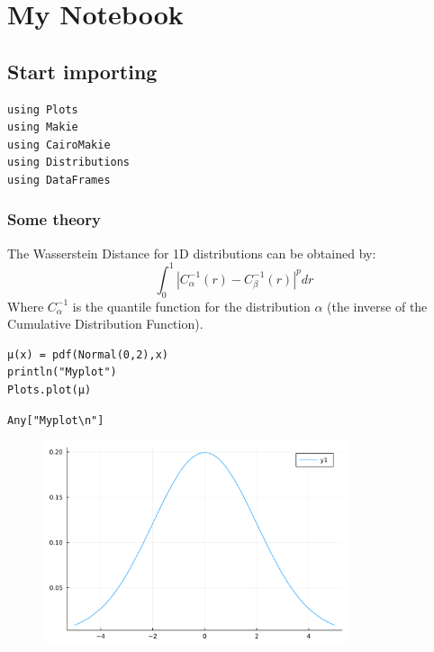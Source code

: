 \newpage

\chapter{My Notebook}

\section{Start importing}

\begin{lstlisting}[language=JuliaLocal, style=julia]
using Plots
using Makie
using CairoMakie
using Distributions
using DataFrames
\end{lstlisting}

\subsection{Some theory}
The Wasserstein Distance for 1D distributions can be obtained by:  $$ \int_0^1 |C_\alpha^{-1}(r) - C_\beta^{-1}(r)|^p dr  $$  Where  $C_\alpha^{-1}$ is the quantile function for the distribution  $\alpha$ (the inverse of the Cumulative Distribution Function). 
\begin{lstlisting}[language=JuliaLocal, style=julia]
μ(x) = pdf(Normal(0,2),x)
println("Myplot")
Plots.plot(μ)
\end{lstlisting}

\begin{verbatim}
Any["Myplot\n"]
\end{verbatim}

\begin{figure}[H]
	\centering
	\includegraphics[width=0.8\textwidth]{./figures/jupyternotebook.i_figure1.svg}
	\label{fig:jupyternotebook.i_figure1.svg}

\end{figure}

